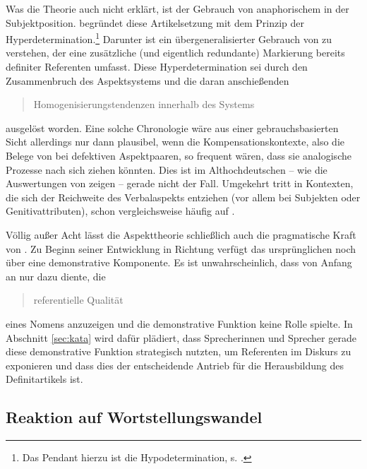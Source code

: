Was die Theorie auch nicht erklärt, ist der Gebrauch von anaphorischem   in der  Subjektposition. \textcite{Leiss2000,Leiss2010} begründet diese Artikelsetzung mit dem Prinzip der Hyperdetermination.\footnote{Das Pendant hierzu ist die Hypodetermination, s. \textcite{Leiss2000}.} Darunter ist ein übergeneralisierter Gebrauch von  zu verstehen, der eine zusätzliche (und eigentlich redundante) Markierung bereits definiter Referenten umfasst. Diese Hyperdetermination sei durch den Zusammenbruch des Aspektsystems  und die daran anschießenden \blockcquote[196]{Leiss2000}{Homogenisierungstendenzen innerhalb des Systems} ausgelöst worden. Eine solche Chronologie wäre aus einer gebrauchsbasierten Sicht allerdings nur dann plausibel, wenn die Kompensationskontexte, also die Belege von  bei defektiven  Aspektpaaren, so frequent wären, dass sie analogische Prozesse nach sich ziehen könnten. Dies ist im Althochdeutschen -- wie die Auswertungen von \textcite[170--181]{Leiss2000} zeigen -- gerade nicht der Fall. 
Umgekehrt tritt  in Kontexten, die sich der Reichweite des Verbalaspekts  entziehen (vor allem bei Subjekten  oder Genitivattributen), schon vergleichsweise häufig auf \parencite[s. auch][]{Oubouzar1992}.  

Völlig außer Acht lässt die Aspekttheorie  schließlich auch die pragmatische Kraft von . Zu Beginn seiner Entwicklung in Richtung  verfügt das ursprünglichen  noch über eine demonstrative Komponente. Es ist unwahrscheinlich, dass  von Anfang an nur dazu diente, die \blockcquote[281]{Leiss2000}{referentielle Qualität} eines Nomens anzuzeigen und die demonstrative Funktion keine Rolle spielte. In Abschnitt \ref{sec:kata} wird dafür plädiert, dass Sprecherinnen und Sprecher gerade diese demonstrative Funktion strategisch nutzten, um Referenten im Diskurs zu exponieren und dass dies der entscheidende Antrieb für die Herausbildung des Definitartikels  ist. 

\subsection{Reaktion auf Wortstellungswandel}\label{wortstellungswandel}

